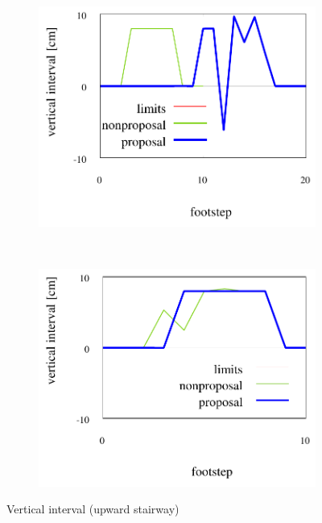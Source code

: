 \documentclass[autodetect-engine,dvipdfmx-if-dvi,ja=standard,a4j,jbase=11pt,magstyle=nomag*]{bxjsreport}
\begin{document}
\begin{figure}[pt]%
    \centering%
    \begin{subfigure}[c]{\linewidth}
        \centering%
        \includegraphics[width=0.75\linewidth, clip]{./figure/sim_hrp2_stair_upbad_zdiff.pdf}%
        \label{fig:sim_hrp2_stair_upbad_zdiff}%
    \end{subfigure}\\ %
    \vfil%
    \begin{subfigure}[c]{\linewidth}
        \centering%
        \includegraphics[width=0.75\linewidth, clip]{./figure/sim_hrp2_stair_up_zdiff.pdf}%
        \label{fig:sim_hrp2_stair_upgood_zdiff}%
    \end{subfigure}%
    \caption{Vertical interval (upward stairway)}%
    \label{fig:sim_hrp2_stair_up_zdiff}%
\end{figure}
\end{document}
